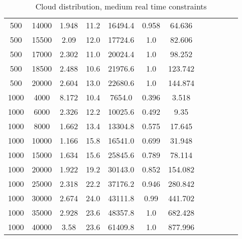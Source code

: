 \begin{table}[htb]
\begin{tabular}{|c|c|c|c|c|c|c|c|c|c|c|c|}
		500 & 14000 & 1.948 & 11.2 & 16494.4 & 0.958 & 64.636 & & & & &  \\ 
		500 & 15500 & 2.09 & 12.0 & 17724.6 & 1.0 & 82.606 & & & & &  \\ 
		500 & 17000 & 2.302 & 11.0 & 20024.4 & 1.0 & 98.252 & & & & &  \\ 
		500 & 18500 & 2.488 & 10.6 & 21976.6 & 1.0 & 123.742 & & & & &  \\ 
		500 & 20000 & 2.604 & 13.0 & 22680.6 & 1.0 & 144.874 & & & & &  \\ 
		1000 & 4000 & 8.172 & 10.4 & 7654.0 & 0.396 & 3.518 & & & & &  \\ 
		1000 & 6000 & 2.326 & 12.2 & 10025.6 & 0.492 & 9.35 & & & & &  \\ 
		1000 & 8000 & 1.662 & 13.4 & 13304.8 & 0.575 & 17.645 & & & & &  \\ 
		1000 & 10000 & 1.166 & 15.8 & 16541.0 & 0.699 & 31.948 & & & & &  \\ 
		1000 & 15000 & 1.634 & 15.6 & 25845.6 & 0.789 & 78.114 & & & & &  \\ 
		1000 & 20000 & 1.922 & 19.2 & 30143.0 & 0.852 & 154.082 & & & & &  \\ 
		1000 & 25000 & 2.318 & 22.2 & 37176.2 & 0.946 & 280.842 & & & & &  \\ 
		1000 & 30000 & 2.674 & 24.0 & 43111.8 & 0.99 & 441.702 & & & & &  \\ 
		1000 & 35000 & 2.928 & 23.6 & 48357.8 & 1.0 & 682.428 & & & & &  \\ 
		1000 & 40000 & 3.58 & 23.6 & 61409.8 & 1.0 & 877.996 & & & & &  \\ 
		\hline 
	\end{tabular} 
	\caption{Cloud distribution, medium real time constraints} 
	\label{tab:cloud_medium} 
\end{table} 

